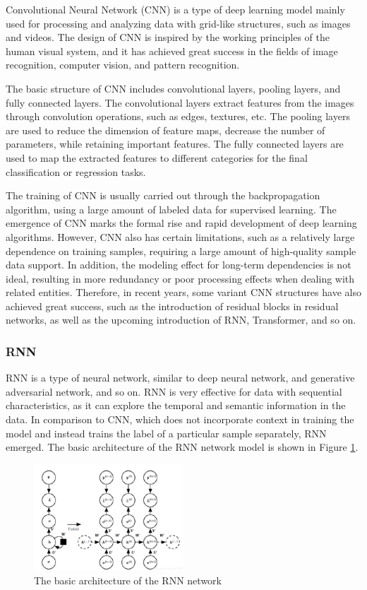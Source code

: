 \documentclass[10pt,twocolumn,letterpaper]{article}
\begin{document}
Convolutional Neural Network (CNN) is a type of deep learning model mainly used for processing and analyzing data with grid-like structures, such as images and videos. The design of CNN is inspired by the working principles of the human visual system, and it has achieved great success in the fields of image recognition, computer vision, and pattern recognition.

The basic structure of CNN includes convolutional layers, pooling layers, and fully connected layers. The convolutional layers extract features from the images through convolution operations, such as edges, textures, etc. The pooling layers are used to reduce the dimension of feature maps, decrease the number of parameters, while retaining important features. The fully connected layers are used to map the extracted features to different categories for the final classification or regression tasks.

The training of CNN is usually carried out through the backpropagation algorithm, using a large amount of labeled data for supervised learning. The emergence of CNN marks the formal rise and rapid development of deep learning algorithms. However, CNN also has certain limitations, such as a relatively large dependence on training samples, requiring a large amount of high-quality sample data support. In addition, the modeling effect for long-term dependencies is not ideal, resulting in more redundancy or poor processing effects when dealing with related entities. Therefore, in recent years, some variant CNN structures have also achieved great success, such as the introduction of residual blocks in residual networks, as well as the upcoming introduction of RNN, Transformer, and so on.



\subsubsection[short]{RNN}

RNN is a type of neural network, similar to deep neural network, and generative adversarial network, and so on. RNN is very effective for data with sequential characteristics, as it can explore the temporal and semantic information in the data. In comparison to CNN, which does not incorporate context in training the model and instead trains the label of a particular sample separately, RNN emerged. The basic architecture of the RNN network model is shown in Figure \ref{fig3}.
\begin{figure}
  \centering %
  \includegraphics[width=0.5\textwidth]{image3.png} %
  \caption{The basic architecture of the RNN network} %
  \label{fig3}
\end{figure}
\end{document}
